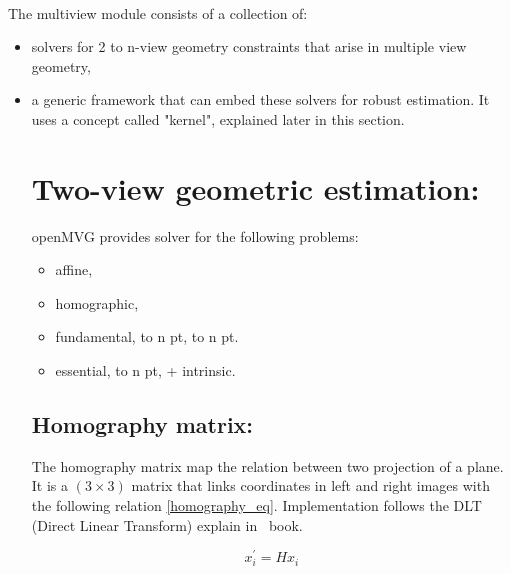 \documentclass[11pt, letterpaper]{report}
\begin{document}
\paragraph{}
The multiview module consists of a collection of:
\begin{itemize}
\item solvers for 2 to n-view geometry constraints that arise in multiple view geometry,
\item a generic framework that can embed these solvers for robust estimation. It uses a concept called "kernel", explained later in this section.


\section{Two-view geometric estimation:}
openMVG provides solver for the following problems:
\begin{itemize}
\item affine,
\item homographic,
\item fundamental,
 to n pt,
 to n pt.
\item essential,
 to n pt,
\subitem 5pt + intrinsic.
\end{itemize}



\newpage
\subsection{Homography matrix:}

The homography matrix map the relation between two projection of a plane. It is a $(3\times3)$ matrix that links coordinates in left and right images with the following relation \ref{homography_eq}. Implementation follows the DLT (Direct Linear Transform) explain in~\cite{Hartley2004} book.

\begin{equation}
x_i^{\prime} = H x_i
\label{homography_eq}
\end{equation}


\end{itemize}
\end{document}
